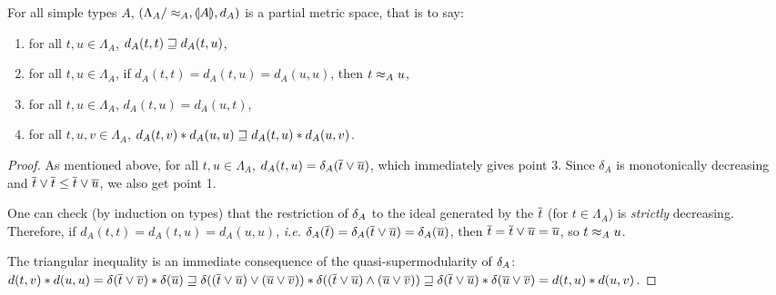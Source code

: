 \begin{corollary} \label{corollary:stlc-metric} For all simple types $A$, $\left(\Lambda_A/\approx_A, \llparenthesis A \rrparenthesis, d_A\right)$ is a partial metric space, that is to say:
\begin{enumerate}
\item for all $t,u \in \Lambda_A$, $d_A(t,t) \sqsupseteq d_A(t,u)$,
\item for all $t,u \in \Lambda_A$, if $d_A(t,t) = d_A(t,u) = d_A(u,u)$, then $t \approx_A u$,
\item for all $t,u \in \Lambda_A$, $d_A(t,u) = d_A(u,t)$,
\item for all $t,u,v \in \Lambda_A$, $d_A(t,v) \mathbin{\ast} d_A(u,u) \sqsupseteq d_A(t,u) \mathbin{\ast} d_A(u,v)$.
\end{enumerate}
\end{corollary}
\begin{proof}
As mentioned above, for all $t,u\in\Lambda_A$, $d_A(t,u) = \delta_A(\overline{t} \vee \overline{u})$, which immediately gives point 3. Since $\delta_A$ is monotonically decreasing and $\overline{t} \vee \overline{t} \leq \overline{t} \vee \overline{u}$, we also get point 1.

One can check (by induction on types) that the restriction of $\delta_A$ to the ideal generated by the $\overline{t}$ (for $t \in \Lambda_A$) is \emph{strictly} decreasing. Therefore, if  $d_A(t,t) = d_A(t,u) = d_A(u,u)$, \textit{i.e.} $\delta_A(\overline{t}) = \delta_A(\overline{t} \vee \overline{u}) = \delta_A(\overline{u})$,  then $\overline{t} = \overline{t} \vee \overline{u} = \overline{u}$, so $t \approx_A u$.

The triangular inequality is an immediate consequence of the quasi-supermodularity of $\delta_A$: $d(t,v) \mathbin{\ast} d(u,u) = \delta(\overline{t} \vee \overline{v}) \mathbin{\ast} \delta(\overline{u}) \sqsupseteq \delta((\overline{t} \vee \overline{u}) \vee (\overline{u} \vee \overline{v})) \mathbin{\ast} \delta((\overline{t} \vee \overline{u}) \wedge (\overline{u} \vee \overline{v})) \sqsupseteq \delta(\overline{t} \vee  \overline{u}) \mathbin{\ast} \delta(\overline{u} \vee  \overline{v}) = d(t,u) \mathbin{\ast} d(u,v)$.
\end{proof}



















